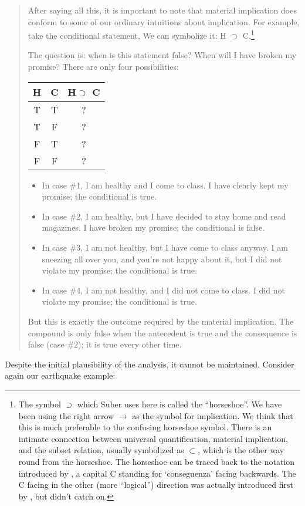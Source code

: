 \begin{quote}
	
	After saying all this, it is important to note that material implication does
  conform to some of our ordinary intuitions about implication. For example,
  take the conditional statement,  We can symbolize it: H $\supset$ C.\footnote{The symbol $\supset$
    which Suber uses here is called the ``horseshoe''. We have been using the
    right arrow $\rightarrow$ as the symbol for implication. We think that this
    is much preferable to the confusing horseshoe symbol. There is an intimate
    connection between universal quantification, material implication, and the
    subset relation, usually symbolized as $\subset$, which is the other way
    round from the horseshoe. The horseshoe can be traced back to the notation
    introduced by \citet{peano:1889:nova}, a capital C standing for
    `conseguenza' facing backwards. The C facing in the other (more ``logical'')
    direction was actually introduced first by \citet{gergonne:1817:essai}, but
    didn't catch on.}
	
	The question is: when is this statement false? When will I have broken my
  promise? There are only four possibilities:
	
	\begin{center}
		\begin{tabular}
			{c|c||c} H & C & H$\supset$ C\\
			\hline T & T & ?\\
			T & F & ?\\
			F & T & ?\\
			F & F & ? 
		\end{tabular}
	\end{center}

\begin{itemize}
		
\item In case \#1, I am healthy and I come to class. I have clearly kept my
  promise; the conditional is true.
\item In case \#2, I am healthy, but I have decided to stay home and read
  magazines. I have broken my promise; the conditional is false.
\item In case \#3, I am not healthy, but I have come to class anyway. I am
  sneezing all over you, and you're not happy about it, but I did not violate my
  promise; the conditional is true.
\item In case \#4, I am not healthy, and I did not come to class. I did not
  violate my promise; the conditional is true.

\end{itemize}
%	
But this is exactly the outcome required by the material implication. The
compound is only false when the antecedent is true and the consequence is false
(case \#2); it is true every other time.

\end{quote}
%
Despite the initial plausibility of the analysis, it cannot be maintained.
Consider again our earthquake example:

